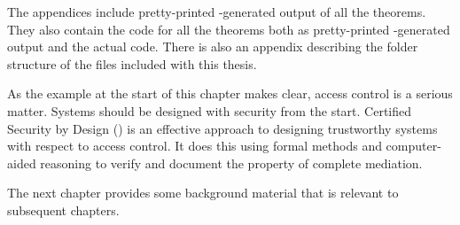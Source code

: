 \documentclass[../../main/main.tex]{subfiles}
\begin{document}
The appendices include pretty-printed -generated output of all the  theorems.  They also contain the code for all the  theorems both as pretty-printed -generated output and the actual code.  There is also an appendix describing the folder structure of the files included with this thesis.


As the example at the start of this chapter makes clear, access control is a serious matter.  Systems should be designed with security from the start.   Certified Security by Design ()  is an effective approach to designing trustworthy systems with respect to access control.  It does this using formal methods and computer-aided reasoning to verify and document the property of complete mediation.

The next chapter provides some background material that is relevant to subsequent chapters.
\end{document}

